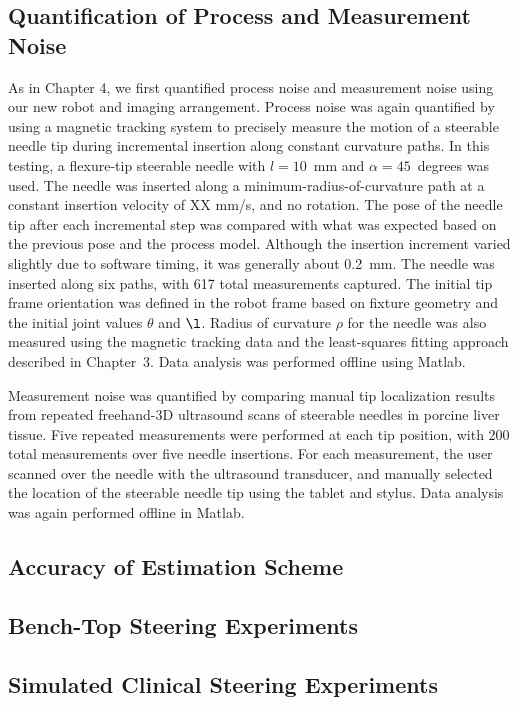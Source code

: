 \subsection{Quantification of Process and Measurement Noise}
As in Chapter 4, we first quantified process noise and measurement noise using our new robot and imaging arrangement. Process noise was again quantified by using a magnetic tracking system to precisely measure the motion of a steerable needle tip during incremental insertion along constant curvature paths. In this testing, a flexure-tip steerable needle with $l = 10$~mm and $\alpha = 45$~degrees was used. The needle was inserted along a minimum-radius-of-curvature path at a constant insertion velocity of XX mm/s, and no rotation. The pose of the needle tip after each incremental step was compared with what was expected based on the previous pose and the process model. Although the insertion increment varied slightly due to software timing, it was generally about 0.2~mm. The needle was inserted along six paths, with 617 total measurements captured. The initial tip frame orientation was defined in the robot frame based on fixture geometry and the initial joint values $\theta$ and $\l$. Radius of curvature $\rho$ for the needle was also measured using the magnetic tracking data and the least-squares fitting approach described in Chapter~3. Data analysis was performed offline using Matlab. 

Measurement noise was quantified by comparing manual tip localization results from repeated freehand-3D ultrasound scans of steerable needles in porcine liver tissue. Five repeated measurements were performed at each tip position, with 200 total measurements over five needle insertions. For each measurement, the user scanned over the needle with the ultrasound transducer, and manually selected the location of the steerable needle tip using the tablet and stylus. Data analysis was again performed offline in Matlab.

\subsection{Accuracy of Estimation Scheme}

\subsection{Bench-Top Steering Experiments}

\subsection{Simulated Clinical Steering Experiments}


